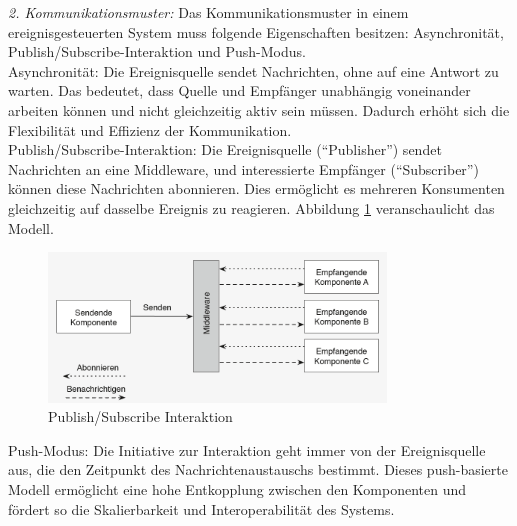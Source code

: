 \documentclass[a4paper,12pt]{article}
\begin{document}
\textit{2. Kommunikationsmuster:} \newline
Das Kommunikationsmuster in einem ereignisgesteuerten System muss folgende Eigenschaften besitzen: Asynchronität, Publish/Subscribe-Interaktion und Push-Modus.\\
Asynchronität: Die Ereignisquelle sendet Nachrichten, ohne auf eine Antwort zu warten. Das bedeutet, dass Quelle und Empfänger unabhängig voneinander arbeiten können und nicht gleichzeitig aktiv sein müssen. Dadurch erhöht sich die Flexibilität und Effizienz der Kommunikation.\\
Publish/Subscribe-Interaktion: Die Ereignisquelle (“Publisher”) sendet Nachrichten an eine Middleware, und interessierte Empfänger (“Subscriber”) können diese Nachrichten abonnieren. Dies ermöglicht es mehreren Konsumenten gleichzeitig auf dasselbe Ereignis zu reagieren.
Abbildung \ref{fig:PubSub} veranschaulicht das Modell.

\begin{figure}[h]
    \centering
    \includegraphics[width=0.8\textwidth]{images/Publish_Subscirbe.png}
    \caption{Publish/Subscribe Interaktion \cite[S. 54]{Bruns2010}}
    \label{fig:PubSub}
\end{figure}
Push-Modus: Die Initiative zur Interaktion geht immer von der Ereignisquelle aus, die den Zeitpunkt des Nachrichtenaustauschs bestimmt. Dieses push-basierte Modell ermöglicht eine hohe Entkopplung zwischen den Komponenten und fördert so die Skalierbarkeit und Interoperabilität des Systems. \cite [S. 53f]{Bruns2010}
\end{document}
